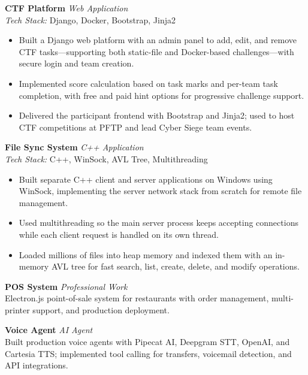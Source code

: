 \documentclass[11pt,a4paper]{article}
\newcommand{\resumeItemList}{\begin{itemize}[leftmargin=*, nosep, topsep=2pt]}
\newcommand{\resumeItemListEnd}{\end{itemize}}
\begin{document}
\vspace{4pt}

\textbf{CTF Platform} \hfill \textit{Web Application} \\
\textit{Tech Stack:} Django, Docker, Bootstrap, Jinja2
\resumeItemList
  \item Built a Django web platform with an admin panel to add, edit, and remove CTF tasks---supporting both static-file and Docker-based challenges---with secure login and team creation.
  \item Implemented score calculation based on task marks and per-team task completion, with free and paid hint options for progressive challenge support.
  \item Delivered the participant frontend with Bootstrap and Jinja2; used to host CTF competitions at PFTP and lead Cyber Siege team events.
\resumeItemListEnd

\vspace{4pt}

\textbf{File Sync System} \hfill \textit{C++ Application} \\
\textit{Tech Stack:} C++, WinSock, AVL Tree, Multithreading
\resumeItemList
  \item Built separate C++ client and server applications on Windows using WinSock, implementing the server network stack from scratch for remote file management.
  \item Used multithreading so the main server process keeps accepting connections while each client request is handled on its own thread.
  \item Loaded millions of files into heap memory and indexed them with an in-memory AVL tree for fast search, list, create, delete, and modify operations.
\resumeItemListEnd

\vspace{4pt}

\textbf{POS System} \hfill \textit{Professional Work} \\
Electron.js point-of-sale system for restaurants with order management, multi-printer support, and production deployment.

\vspace{4pt}

\textbf{Voice Agent} \hfill \textit{AI Agent} \\
Built production voice agents with Pipecat AI, Deepgram STT, OpenAI, and Cartesia TTS; implemented tool calling for transfers, voicemail detection, and API integrations.

\vspace{2pt}
\end{document}
